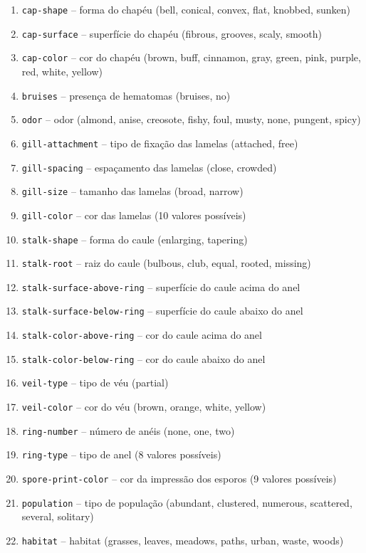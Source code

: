 \documentclass[12pt,a4paper]{article}
\begin{document}
\begin{enumerate}
    \item \texttt{cap-shape} -- forma do chapéu (bell, conical, convex, flat, knobbed, sunken)
    \item \texttt{cap-surface} -- superfície do chapéu (fibrous, grooves, scaly, smooth)
    \item \texttt{cap-color} -- cor do chapéu (brown, buff, cinnamon, gray, green, pink, purple, red, white, yellow)
    \item \texttt{bruises} -- presença de hematomas (bruises, no)
    \item \texttt{odor} -- odor (almond, anise, creosote, fishy, foul, musty, none, pungent, spicy)
    \item \texttt{gill-attachment} -- tipo de fixação das lamelas (attached, free)
    \item \texttt{gill-spacing} -- espaçamento das lamelas (close, crowded)
    \item \texttt{gill-size} -- tamanho das lamelas (broad, narrow)
    \item \texttt{gill-color} -- cor das lamelas (10 valores possíveis)
    \item \texttt{stalk-shape} -- forma do caule (enlarging, tapering)
    \item \texttt{stalk-root} -- raiz do caule (bulbous, club, equal, rooted, missing)
    \item \texttt{stalk-surface-above-ring} -- superfície do caule acima do anel
    \item \texttt{stalk-surface-below-ring} -- superfície do caule abaixo do anel
    \item \texttt{stalk-color-above-ring} -- cor do caule acima do anel
    \item \texttt{stalk-color-below-ring} -- cor do caule abaixo do anel
    \item \texttt{veil-type} -- tipo de véu (partial)
    \item \texttt{veil-color} -- cor do véu (brown, orange, white, yellow)
    \item \texttt{ring-number} -- número de anéis (none, one, two)
    \item \texttt{ring-type} -- tipo de anel (8 valores possíveis)
    \item \texttt{spore-print-color} -- cor da impressão dos esporos (9 valores possíveis)
    \item \texttt{population} -- tipo de população (abundant, clustered, numerous, scattered, several, solitary)
    \item \texttt{habitat} -- habitat (grasses, leaves, meadows, paths, urban, waste, woods)
\end{enumerate}
\end{document}
